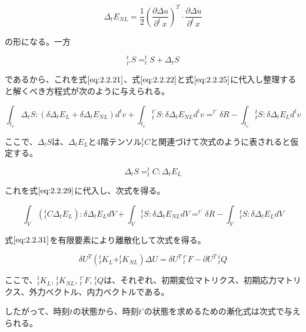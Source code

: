 \documentclass[a4paper,pandoc,ja=standard]{bxjsarticle}
\begin{document}
\begin{equation}
\Delta_t E_{NL} = \frac{1}{2} \left( \frac{ \partial \Delta u}{\partial ^t\,x}\right)^T \cdot \frac{ \partial \Delta u}{\partial^t\,x}
\label{eq:2.2.27}
\end{equation}

の形になる。一方

\begin{equation}
_{t'}^{t} S = _{t}^{t} S + \Delta _{t} S
\label{eq:2.2.28}
\end{equation}

であるから、これを式\(\eqref{eq:2.2.21}\)、式\(\eqref{eq:2.2.22}\)と式\(\eqref{eq:2.2.25}\)に代入し整理すると解くべき方程式が次のように与えられる。

\begin{equation}
\int_{t_{v}} \Delta_{t} S : (\delta \Delta_{t}{E_{L}} + \delta \Delta_t{E_{NL}})d^t{v} + \int_{t_{v}}{_{t}^{t'}S} : \delta \Delta_{t} {E_{NL}}d^t{v}=^{t'} \delta R - \int_{t_{v}}{_{t}^t S} : \delta \Delta_{t} E_{L}d^t{v}
\label{eq:2.2.29}
\end{equation}

ここで、\(\Delta_t S\)は、\(\Delta_{t}{E_{L}}\)と4階テンソル\(^t_t C\)と関連づけて次式のように表されると仮定する。

\begin{equation}
\Delta_t S = ^t_t C : \Delta_t E_{L}
\label{eq:2.2.30}
\end{equation}

これを式\(\eqref{eq:2.2.29}\)に代入し、次式を得る。

\begin{equation}
\int_V ( ^t_t C \Delta_{t} E_{L} ) : \delta \Delta_{t} E_{L} dV+\int_V{^t_{t} S} : \delta \Delta_{t} E_{NL} dV = ^{t'} \delta R - \int_V{_{t}^t S} : \delta \Delta_t E_{L} dV
\label{eq:2.2.31}
\end{equation}

式\(\eqref{eq:2.2.31}\)を有限要素により離散化して次式を得る。

\begin{equation}
\delta U^T ( ^t_t K_{L} + ^t_t K_{NL} ) \Delta U = \delta U^{T}\, {_{t}^{t'}} F - \partial U^T\, {^t_{t} Q}
\label{eq:2.2.32}
\end{equation}

ここで、\(^t_t K_L\), \(^t_t K_{NL}\), \({_t^{t'}} F\), \({^t_t Q}\)は、それぞれ、初期変位マトリクス、初期応力マトリクス、外力ベクトル、内力ベクトルである。

したがって、時刻\(t\)の状態から、時刻\(t’\)の状態を求めるための漸化式は次式で与えられる。
\end{document}
